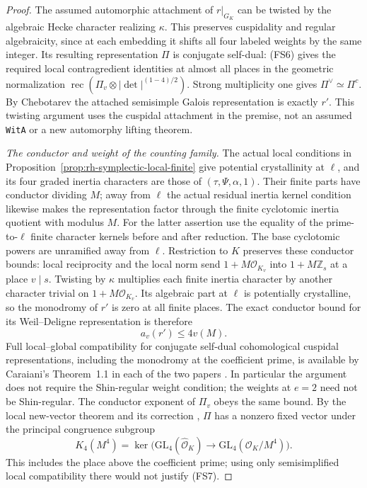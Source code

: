\begin{proof}
The assumed automorphic attachment of \(r|_{G_K}\) can be
twisted by the algebraic Hecke character realizing \(\kappa\).
This preserves cuspidality and regular algebraicity, since
at each embedding it shifts all four labeled weights by
the same integer. Its resulting representation \(\Pi\)
is conjugate self-dual: (FS6) gives the required local
contragredient identities at almost all places in the
geometric normalization \(\operatorname{rec}(\Pi_v
\otimes|\det|^{(1-4)/2})\).
Strong multiplicity one gives \(\Pi^\vee\simeq\Pi^c\).
By Chebotarev the attached semisimple Galois representation
is exactly \(r'\). This twisting argument uses the
cuspidal attachment in the premise, not an assumed
\texttt{WitA} or a new automorphy lifting theorem.

\emph{The conductor and weight of the counting family.}
The actual local conditions in
Proposition~\ref{prop:rh-symplectic-local-finite} give
potential crystallinity at \(\ell\), and its four graded
inertia characters are those of
\((\tau,\Psi,\alpha,1)\).
Their finite parts have conductor dividing \(M\);
away from \(\ell\) the actual residual inertia kernel
condition likewise makes the representation factor through
the finite cyclotomic inertia quotient with modulus \(M\).
For the latter assertion use the equality of the
prime-to-\(\ell\) finite character kernels before and
after reduction. The base cyclotomic powers are
unramified away from \(\ell\).
Restriction to \(K\) preserves these conductor bounds:
local reciprocity and the local norm send
\(1+M\mathcal O_{K_v}\) into \(1+M\mathbb Z_s\) at a
place \(v\mid s\).
Twisting by \(\kappa\) multiplies each finite inertia
character by another character trivial on
\(1+M\mathcal O_{K_v}\).
Its algebraic part at \(\ell\) is potentially crystalline,
so the monodromy of \(r'\) is zero at all finite places.
The exact conductor bound for its Weil--Deligne representation
is therefore
\[
                  a_v(r')\le4v(M).
\]
Full local--global compatibility for conjugate self-dual
cohomological cuspidal representations, including the
monodromy at the coefficient prime, is available by
Caraiani's Theorem~1.1 in each of the two papers
\cite{support-spectrum-Caraiani2012,support-spectrum-Caraiani2014}.
In particular the argument does not require the
Shin-regular weight condition; the weights at \(e=2\)
need not be Shin-regular.
The conductor exponent of \(\Pi_v\) obeys the same bound.
By the local new-vector theorem and its correction
\cite{support-spectrum-newvector}, \(\Pi\) has a nonzero
fixed vector under the principal congruence subgroup
\[
 K_4(M^4)=\ker\bigl(\mathrm{GL}_4(\widehat{\mathcal O}_K)
         \longrightarrow\mathrm{GL}_4(\mathcal O_K/M^4)\bigr).
                                                               \tag{FS7}
\]
This includes the place above the coefficient prime; using
only semisimplified local compatibility there would not
justify (FS7).


\end{proof}
